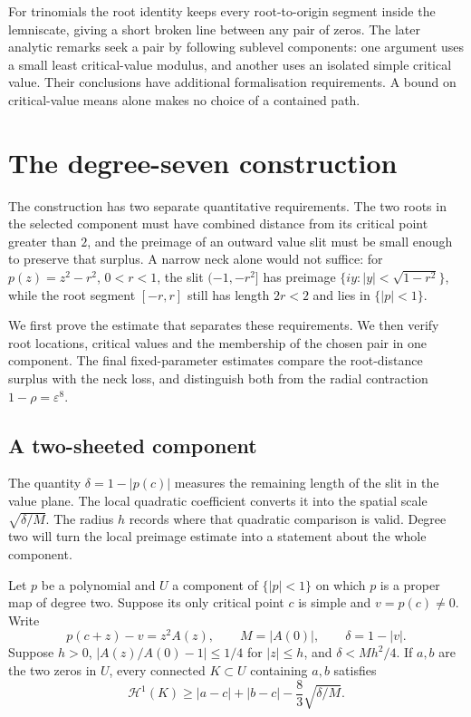 For trinomials the root identity keeps every root-to-origin segment
inside the lemniscate, giving a short broken line between any pair of
zeros. The later analytic remarks seek a pair by following sublevel
components: one argument uses a small least critical-value modulus,
and another uses an isolated simple critical value. Their conclusions
have additional formalisation requirements. A bound on critical-value
means alone makes no choice of a contained path.

\section{The degree-seven construction}\label{sec:counterexample-proof}

The construction has two separate quantitative requirements. The two
roots in the selected component must have combined distance from its
critical point greater than $2$, and the preimage of an outward value
slit must be small enough to preserve that surplus. A narrow neck alone
would not suffice: for $p(z)=z^2-r^2$, $0<r<1$, the slit
$(-1,-r^2]$ has preimage $\{iy:|y|<\sqrt{1-r^2}\}$, while the root
segment $[-r,r]$ still has length $2r<2$ and lies in $\{|p|<1\}$.

We first prove the estimate that separates these requirements. We then
verify root locations, critical values and the membership of the chosen
pair in one component. The final fixed-parameter estimates compare the root-distance
surplus with the neck loss, and distinguish both from the radial
contraction $1-\rho=\varepsilon^8$.

\subsection{A two-sheeted component}\label{subsec:two-sheet-bottleneck}

The quantity $\delta=1-|p(c)|$ measures the remaining length of the
slit in the value plane. The local quadratic coefficient converts it
into the spatial scale $\sqrt{\delta/M}$. The radius $h$ records where
that quadratic comparison is valid. Degree two will turn the local
preimage estimate into a statement about the whole component.

\begin{lemma}\label{lem:two-sheet-bottleneck-long}
Let $p$ be a polynomial and $U$ a component of $\{|p|<1\}$ on which $p$
is a proper map of degree two. Suppose its only critical point $c$ is
simple and $v=p(c)\ne0$.
Write
\[
 p(c+z)-v=z^2 A(z),\qquad M=|A(0)|,\qquad \delta=1-|v|.
\]
Suppose $h>0$, $|A(z)/A(0)-1|\le1/4$ for $|z|\le h$, and
$\delta<Mh^2/4$. If $a,b$ are the two zeros in $U$, every connected
$K\subset U$ containing $a,b$ satisfies
\[
 \mathcal H^1(K)\ge |a-c|+|b-c|-\frac83\sqrt{\delta/M}.
\]
\end{lemma}

